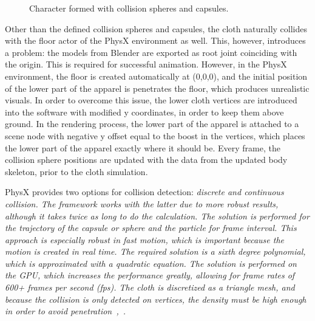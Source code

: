 \begin{figure}[h]
\centerline{}
\caption{Character formed with collision spheres and capsules.}
\label{fig:colliding_human_body}
\end{figure}

Other than the defined collision spheres and capsules, the cloth naturally collides with the floor actor of the PhysX environment as well. This, however, introduces a problem: the models from Blender are exported as root joint coinciding with the origin. This is required for successful animation. However, in the PhysX environment, the floor is created automatically at (0,0,0), and the initial position of the lower part of the apparel is penetrates the floor, which produces unrealistic visuals. In order to overcome this issue, the lower cloth vertices are introduced into the software with modified y coordinates, in order to keep them above ground. In the rendering process, the lower part of the apparel is attached to a scene node with negative y offset equal to the boost in the vertices, which places the lower part of the apparel exactly where it should be. Every frame, the collision sphere positions are updated with the data from the updated body skeleton, prior to the cloth simulation. 

PhysX provides two options for collision detection: \em{discrete} and \em{continuous} collision. The framework works with the latter due to more robust results, although it takes twice as long to do the calculation. The solution is performed for the trajectory of the capsule or sphere and the particle for frame interval. This approach is especially robust in fast motion, which is important because the motion is created in real time. The required solution is a sixth degree polynomial, which is approximated with a quadratic equation. The solution is performed on the GPU, which increases the performance greatly, allowing for frame rates of 600+ frames per second (fps). The cloth is discretized as a triangle mesh, and because the collision is only detected on vertices, the density must be high enough in order to avoid penetration~\cite{Kim2011},~\cite{Tonge2010}. 

